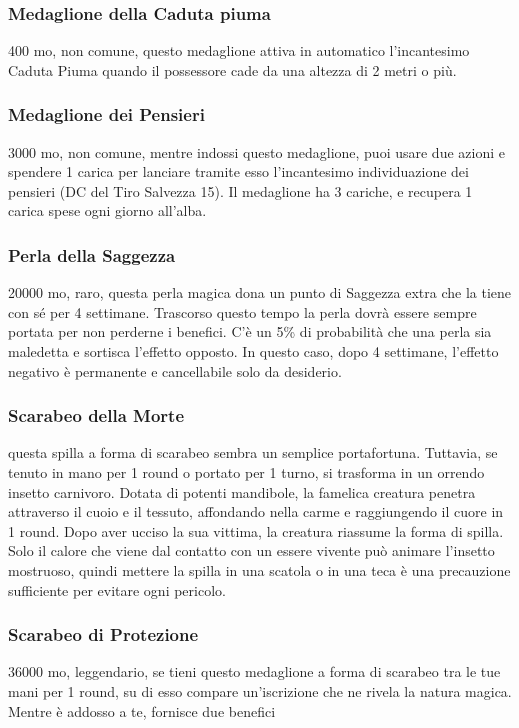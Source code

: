 \begin{multicols}{2}
\subsubsection*{Medaglione della Caduta piuma}
400 mo, non comune, questo medaglione attiva in automatico l'incantesimo Caduta Piuma quando il possessore cade da una altezza di 2 metri o più.

\subsubsection*{Medaglione dei Pensieri}
3000 mo, non comune, mentre indossi questo medaglione, puoi usare due azioni e spendere 1 carica per lanciare tramite esso l'incantesimo individuazione dei pensieri (DC del Tiro Salvezza 15). Il medaglione ha 3 cariche, e recupera 1 carica spese ogni giorno all'alba.

\subsubsection*{Perla della Saggezza}
20000 mo, raro, questa perla magica dona un punto di Saggezza extra che la tiene con sé per 4 settimane. Trascorso questo tempo la perla dovrà essere sempre portata per non perderne i benefici. C'è un 5\% di probabilità che una perla sia maledetta e sortisca l’effetto opposto. In questo caso, dopo 4 settimane, l’effetto negativo è permanente e cancellabile solo da desiderio.

\subsubsection*{Scarabeo della Morte}
questa spilla a forma di scarabeo sembra un semplice portafortuna. Tuttavia, se tenuto in mano per 1 round o portato per 1 turno, si trasforma in un orrendo insetto carnivoro. Dotata di potenti mandibole, la famelica creatura penetra attraverso il cuoio e il tessuto, affondando nella carme e raggiungendo il cuore in 1 round. Dopo aver ucciso la sua vittima, la creatura riassume la forma di spilla. Solo il calore che viene dal contatto con un essere vivente può animare l’insetto mostruoso, quindi mettere la spilla in una scatola o in una teca è una precauzione sufficiente per evitare ogni pericolo.

\subsubsection*{Scarabeo di Protezione}
36000 mo, leggendario, se tieni questo medaglione a forma di scarabeo tra le tue mani per 1 round, su di esso compare un'iscrizione che ne rivela la natura magica. Mentre è addosso a te, fornisce due benefici


\end{multicols}
